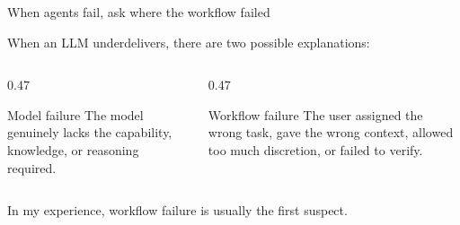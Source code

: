 \documentclass[aspectratio=169,11pt]{beamer}
\begin{document}
\begin{frame}{When agents fail, ask where the workflow failed}

When an LLM underdelivers, there are two possible explanations:

\vspace{0.3cm}

\begin{columns}[T]
\begin{column}{0.47\textwidth}
\begin{block}{Model failure}
\footnotesize
The model genuinely lacks the capability, knowledge, or reasoning required.
\end{block}
\end{column}
\begin{column}{0.47\textwidth}
\begin{block}{Workflow failure}
\footnotesize
The user assigned the wrong task, gave the wrong context, allowed too much discretion, or failed to verify.
\end{block}
\end{column}
\end{columns}

\vspace{0.4cm}

\alert{In my experience, workflow failure is usually the first suspect.}

\end{frame}
\end{document}

